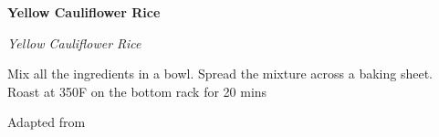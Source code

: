 \documentclass[../recipe-collections/cooking.tex]{subfiles}
\begin{document}
\begin{recipe}{\textbf{Yellow Cauliflower Rice}}{}{}

  \freeform{}\textit{Yellow Cauliflower Rice}


  Mix all the ingredients in a bowl. Spread the mixture across a baking sheet. Roast at 
  350\0F on the bottom rack for 20 mins

  \freeform{}\hrulefill{}

\end{recipe}

Adapted from  \autocite{curp_franziska_spritzler_2021}
\end{document}
